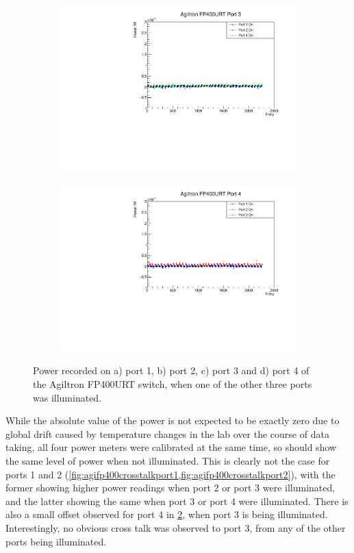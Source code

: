 \documentclass[a4paper,11pt]{article}
\begin{document}
\begin{figure}[h!]
\begin{subfigure}{0.5\textwidth}
\includegraphics[width=\linewidth]{AgiltronFP400URTPort3.pdf}
\subcaption{}\label{fig:agifp400crosstalkport3}
\end{subfigure}%
\begin{subfigure}{0.5\textwidth}
\includegraphics[width=\linewidth]{AgiltronFP400URTPort4.pdf}
\subcaption{}\label{fig:agifp400crosstalkport4}
\end{subfigure}
\caption{Power recorded on a) port 1, b) port 2, c) port 3 and d) port 4 of the Agiltron FP400URT switch, when one of the other three ports was illuminated.}\label{fig:agifp400crosstalk2}
\end{figure}
While the absolute value of the power is not expected to be exactly zero due to global drift caused by temperature changes in the lab over the course of data taking, all four power meters were calibrated at the same time, so should show the same level of power when not illuminated. This is clearly not the case for ports 1 and 2 (\cref{fig:agifp400crosstalkport1,fig:agifp400crosstalkport2}), with the former showing higher power readings when port 2 or port 3 were illuminated, and the latter showing the same when port 3 or port 4 were illuminated. There is also a small offset observed for port 4 in \cref{fig:agifp400crosstalkport4}, when port 3 is being illuminated. Interestingly, no obvious cross talk was observed to port 3, from any of the other ports being illuminated.
\end{document}
